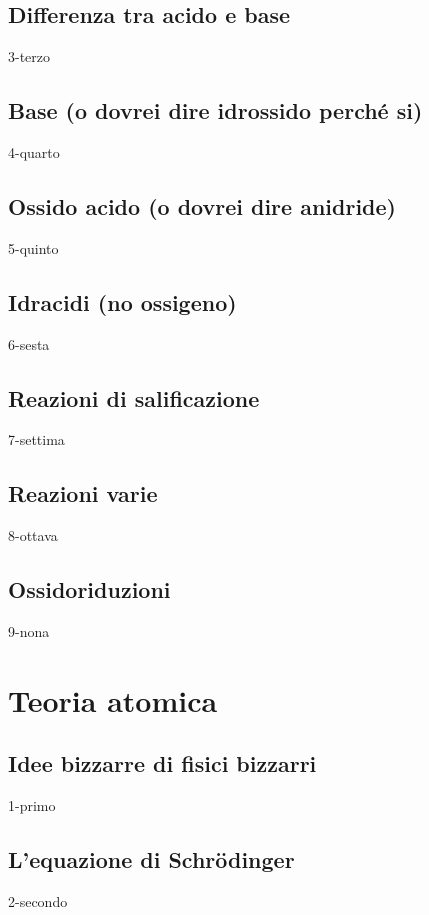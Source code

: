 \documentclass[openany,12pt]{book}%
\begin{document}
\section{Differenza tra acido e base}
{3-terzo}

\section{Base (o dovrei dire idrossido perché si)}
{4-quarto}

\section{Ossido acido (o dovrei dire anidride)}
{5-quinto}

\section{Idracidi (no ossigeno)}
{6-sesta}

\section{Reazioni di salificazione}
{7-settima}

\section{Reazioni varie}
{8-ottava}

\section{Ossidoriduzioni}
{9-nona}

\chapter{Teoria atomica}

\section{Idee bizzarre di fisici bizzarri}
{1-primo}

\section{L'equazione di Schrödinger}
{2-secondo}
\end{document}
